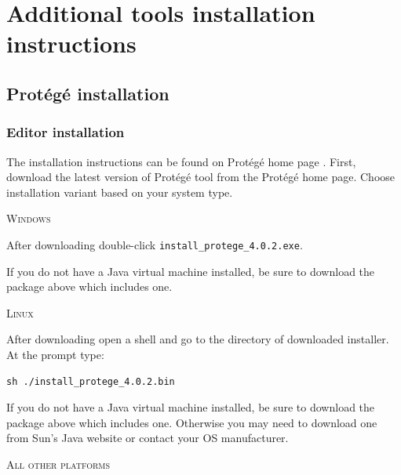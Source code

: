 \setlength{\parindent}{0in}	%

\chapter{Additional tools installation instructions}
\label{cha:additionalToolsInstallationInstructions}

\section{Protégé installation}
\label{sec:protegeInstallation}

\subsection{Editor installation}
\label{sub:editorInstallation}

The installation instructions can be found on Protégé home page \cite{ProtegeHome}. First, download the latest version of Protégé tool from the Protégé home page. Choose installation variant based on your system type.

\bigskip

{\scshape Windows}
\smallskip

After downloading double-click \texttt{install\_protege\_4.0.2.exe}.
\smallskip

\begin{framed}
If you do not have a Java virtual machine installed, be sure to download the package above which includes one. 
\end{framed}

\bigskip

{\scshape Linux}
\smallskip

After downloading open a shell and go to the directory of downloaded installer. At the prompt type:  
\begin{verbatim}
sh ./install_protege_4.0.2.bin 
\end{verbatim}

\begin{framed}
If you do not have a Java virtual machine installed, be sure to download the package above which includes one. Otherwise you may need to download one from Sun's Java website \cite{SunHome} or contact your OS manufacturer. 
\end{framed}

\newpage
{\scshape All other platforms}

